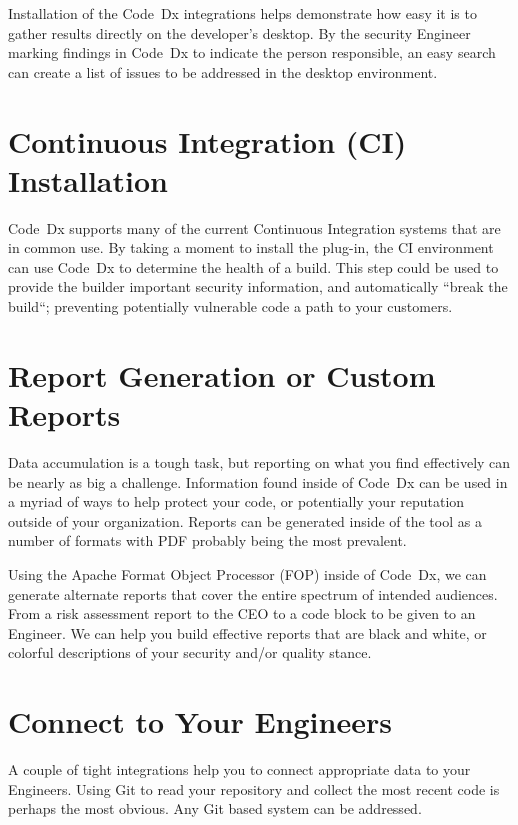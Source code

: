 \documentclass[11pt]{article}
\newcommand\codedx{{\color{blue}Code~Dx}\xspace}
\begin{document}
Installation of the \codedx integrations helps demonstrate how easy it is to gather results directly on the
developer's desktop.  By the security Engineer marking findings in \codedx to indicate the person responsible,
an easy search can create a list of issues to be addressed in the desktop environment.

\section{Continuous Integration (CI) Installation}

\codedx supports many of the current Continuous Integration systems that are in common use.  By
taking a moment to install the plug-in, the CI environment can use \codedx to determine the health of
a build.  This step could be used to provide the builder important security information, and automatically
``break the build``; preventing potentially vulnerable code a path to your customers.

\section{Report Generation or Custom Reports}

Data accumulation is a tough task, but reporting on what you find effectively can be nearly as big a
challenge.  Information found inside of \codedx can be used in a myriad of ways to help protect your
code, or potentially your reputation outside of your organization.  Reports can be generated inside of
the tool as a number of formats with PDF probably being the most prevalent.

Using the Apache Format Object Processor (FOP) inside of \codedx, we can generate alternate
reports that cover the entire spectrum of intended audiences.  From a risk assessment report to the CEO 
to a code block to be given to an Engineer.  We can help you build effective reports that are black and
white, or colorful descriptions of your security and/or quality stance.

\section{Connect to Your Engineers}

A couple of tight integrations help you to connect appropriate data to your Engineers.  Using Git to read
your repository and collect the most recent code is perhaps the most obvious.  Any Git based system
can be addressed.
\end{document}
